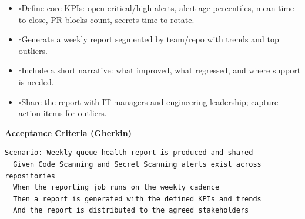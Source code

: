 \documentclass[11pt,a4paper]{article}
\newcommand{\checkbox}{\(\square\)}
\let\cb\checkbox
\newenvironment{TasksBox}[1][Tasks]{%
  \begin{tcolorbox}[
    enhanced,breakable,
    colback=gray!1, colframe=gray!35,
    colbacktitle=gray!6, coltitle=black,
    title={#1}, fonttitle=\bfseries,
    borderline west={1.8pt}{0pt}{MidnightBlue},
    arc=2pt, boxrule=0.4pt,
    left=10pt,right=10pt,top=6pt,bottom=6pt,
    before skip=6pt, after skip=10pt
  ]
  \small
  \begin{itemize}[label=\cb, leftmargin=*, labelsep=0.6em, itemsep=4pt, topsep=2pt, parsep=0pt]
}{%
  \end{itemize}
  \end{tcolorbox}
}
\begin{document}
\begin{TasksBox}[Implementation Tasks]
  \item \cb Define core KPIs: open critical/high alerts, alert age percentiles, mean time to close, PR blocks count, secrets time-to-rotate.
  \item \cb Generate a weekly report segmented by team/repo with trends and top outliers.
  \item \cb Include a short narrative: what improved, what regressed, and where support is needed.
  \item \cb Share the report with IT managers and engineering leadership; capture action items for outliers.
\end{TasksBox}

\textbf{Acceptance Criteria (Gherkin)}
\begin{lstlisting}[language=Gherkin]
Scenario: Weekly queue health report is produced and shared
  Given Code Scanning and Secret Scanning alerts exist across repositories
  When the reporting job runs on the weekly cadence
  Then a report is generated with the defined KPIs and trends
  And the report is distributed to the agreed stakeholders
\end{lstlisting}

\clearpage
\end{document}
